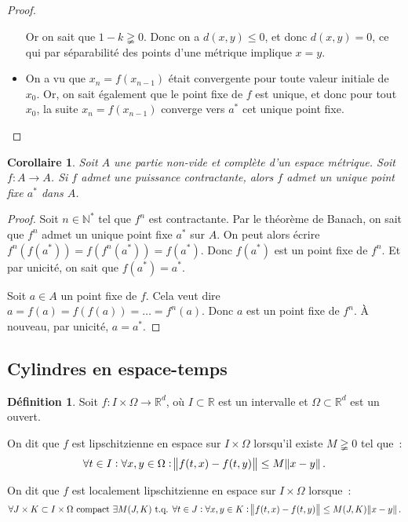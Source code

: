 \documentclass{report}
\newtheorem{cor}[thm]{Corollaire}
\theoremstyle{definition}
\newtheorem{déf}[thm]{Définition}
\theoremstyle{remark}
\numberwithin{equation}{section}
\newcommand{\R}{\mathbb R}
\newcommand{\N}{\mathbb N}
\newcommand{\Ns}{\N^{*}}
\newcommand{\tq}{\text{ t.q. }}
\begin{document}
\begin{proof}
\begin{itemize}
				Or on sait que $1-k \gneqq 0$. Donc on a $d(x, y) \leq 0$, et donc $d(x, y) = 0$, ce qui par séparabilité des points d'une métrique implique $x=y$.
				\item On a vu que $x_n = f(x_{n-1})$ était convergente pour toute valeur initiale de $x_0$. Or, on sait également que le point fixe de $f$ est
				unique, et donc pour tout $x_0$, la suite $x_n = f(x_{n-1})$ converge vers $a^*$ cet unique point fixe.
			\end{itemize}
			\end{proof}

			\begin{cor} Soit $A$ une partie non-vide et complète d'un espace métrique. Soit $f : A \to A$. Si $f$ admet une puissance contractante, alors $f$
			admet un unique point fixe $a^*$ dans $A$.
			\end{cor}

			\begin{proof} Soit $n \in \Ns$ tel que $f^n$ est contractante. Par le théorème de Banach, on sait que $f^n$ admet un unique point fixe $a^*$ sur $A$.
			On peut alors écrire $f^n(f(a^*)) = f(f^n(a^*)) = f(a^*)$. Donc $f(a^*)$ est un point fixe de $f^n$. Et par unicité, on sait que $f(a^*) = a^*$.

			Soit $a \in A$ un point fixe de $f$. Cela veut dire $a = f(a) = f(f(a)) = \ldots = f^n(a)$. Donc $a$ est un point fixe de $f^n$. À nouveau, par
			unicité, $a = a^*$.
			\end{proof}

		\subsection{Cylindres en espace-temps}
			\begin{déf} Soit $f : I \times \Omega \to \R^d$, où $I \subset \R$ est un intervalle et $\Omega \subset \R^d$ est un ouvert.

			On dit que $f$ est lipschitzienne en espace sur $I \times \Omega$ lorsqu'il existe $M \gneqq 0$ tel que~:
			\begin{equation}
				\forall t \in I : \forall x, y \in \Omega : \norm {f(t, x) - f(t, y)} \leq M\norm {x-y}.
			\end{equation}

			On dit que $f$ est localement lipschitzienne en espace sur $I \times \Omega$ lorsque~:
			\begin{equation}
				\forall J \times K \subset I \times \Omega \text{ compact }\exists M(J, K) \tq \forall t \in J :
				\forall x, y \in K : \norm {f(t, x) - f(t, y)} \leq M(J, K)\norm {x-y}.
			\end{equation}
			\end{déf}
\end{document}
